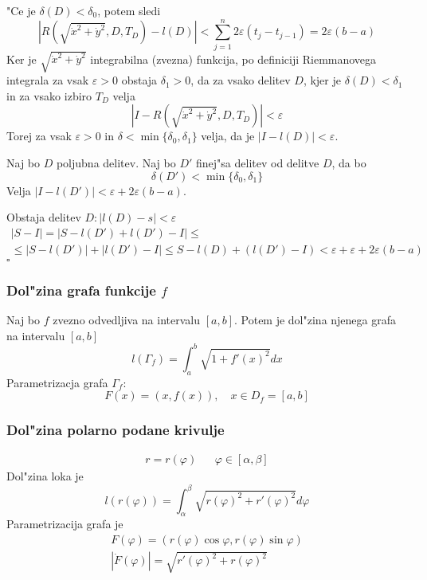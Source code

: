 "Ce je $\delta(D) < \delta_0$, potem sledi 
\begin{equation*}
\left| R\left( \sqrt{\dot{x}^2 + \dot{y}^2}, D, T_D \right) - l(D) \right| < \sum_{j=1}^n 2\varepsilon (t_j - t_{j-1}) = 2\varepsilon(b-a)
\end{equation*}
Ker je $\sqrt{\dot{x}^2 + \dot{y}^2}$ integrabilna (zvezna) funkcija, po definiciji Riemmanovega integrala za vsak $\varepsilon > 0$ obstaja $\delta_1 > 0$, da za vsako delitev $D$, kjer je $\delta(D) < \delta_1$ in za vsako izbiro $T_D$ velja
\begin{equation*}
|I -  R\left( \sqrt{\dot{x}^2 + \dot{y}^2}, D, T_D \right)| < \varepsilon
\end{equation*}
Torej za vsak $\varepsilon > 0$ in $\delta < \min \{\delta_0, \delta_1\}$ velja, da je $|I - l(D)| < \varepsilon$.


Naj bo $D$ poljubna delitev. Naj bo $D'$ finej"sa delitev od delitve $D$, da bo
\begin{equation*}
\delta(D') < \min\{\delta_0, \delta_1\}
\end{equation*}
Velja $|I - l(D')| < \varepsilon + 2 \varepsilon(b - a)$.

Obstaja delitev $D: |l(D) - s| < \varepsilon$
\begin{multline*}
|S - I| = |S - l(D') + l(D') - I| \leq \\
\leq |S - l(D')| + |l(D') - I| \leq S - l(D) + (l(D') - I) < \varepsilon + \varepsilon + 2\varepsilon(b-a)
\end{multline*}
\hfill $\square$

\subsubsection*{Dol"zina grafa funkcije $f$}
Naj bo $f$ zvezno odvedljiva na intervalu $[a, b]$. Potem je dol"zina njenega grafa na intervalu $[a, b]$
\begin{equation*}
l(\Gamma_f) = \int_a^b \sqrt{1 + f'(x)^2} dx
\end{equation*}
Parametrizacja grafa $\Gamma_f$: 
\begin{equation*}
F(x) = (x, f(x)), \quad x \in D_f = [a, b]
\end{equation*}

\subsubsection*{Dol"zina polarno podane krivulje}
\begin{align*}
r = r(\varphi) && \varphi \in [\alpha, \beta]
\end{align*}
Dol"zina loka je
\begin{equation*}
l(r(\varphi)) = \int_\alpha^\beta \sqrt{r(\varphi)^2 + r'(\varphi)^2} d\varphi
\end{equation*}
Parametrizacija grafa je
\begin{gather*}
F(\varphi)  = (r(\varphi) \cos \varphi, r(\varphi) \sin \varphi) \\ 
|\dot{F} (\varphi)| = \sqrt{r'(\varphi)^2 + r(\varphi)^2}
\end{gather*}

